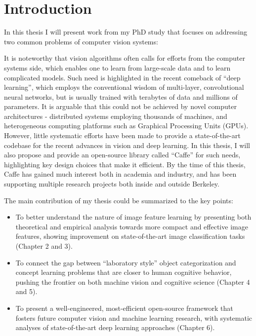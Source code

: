 \chapter{Introduction}

In this thesis I will present work from my PhD study that focuses on addressing two common problems of computer vision systems: 



It is noteworthy that vision algorithms often calls for efforts from the computer systems side, which enables one to learn from large-scale data and to learn complicated models. Such need is highlighted in the recent comeback of ``deep learning'', which employs the conventional wisdom of multi-layer, convolutional neural networks, but is usually trained with terabytes of data and millions of parameters. It is arguable that this could not be achieved by novel computer architectures - distributed systems employing thousands of machines, and heterogeneous computing platforms such as Graphical Processing Units (GPUs). However, little systematic efforts have been made to provide a state-of-the-art codebase for the recent advances in vision and deep learning. In this thesis, I will also propose and provide an open-source library called ``Caffe'' for such needs, highlighting key design choices that make it efficient. By the time of this thesis, Caffe has gained much interest both in academia and industry, and has been supporting multiple research projects both inside and outside Berkeley.

The main contribution of my thesis could be summarized to the key points:

\begin{itemize}
    \item To better understand the nature of image feature learning by presenting both theoretical and empirical analysis towards more compact and effective image features, showing improvement on state-of-the-art image classification tasks (Chapter 2 and 3).
    \item To connect the gap between ``laboratory style'' object categorization and concept learning problems that are closer to human cognitive behavior, pushing the frontier on both machine vision and cognitive science (Chapter 4 and 5).
    \item To present a well-engineered, most-efficient open-source framework that fosters future computer vision and machine learning research, with systematic analyses of state-of-the-art deep learning approaches (Chapter 6).
\end{itemize}

